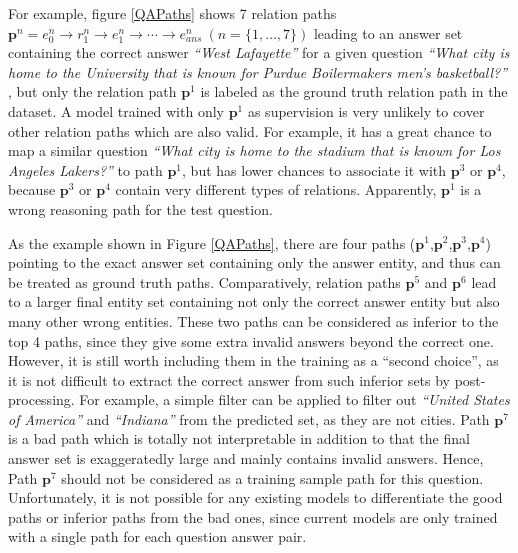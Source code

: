 For example, figure \ref{QAPaths} shows 7 relation paths $\mathbf{p}^n={e^n_0\rightarrow r^n_1 \rightarrow e^n_1 \rightarrow \cdots \rightarrow e^n_{ans}}\ (n=\lbrace 1, \dots, 7 \rbrace)$ leading to an answer set containing the correct answer \textit{``West Lafayette''} for a given question \textit{``What city is home to the University that is known for Purdue Boilermakers men's basketball?''}%
, but only the relation path $\mathbf{p}^1$ is labeled as the ground truth relation path in the dataset. A model trained with only $\mathbf{p}^1$ as supervision is very unlikely to cover other relation paths which are also valid. For example, it has a great chance to map a similar question \textit{``What city is home to the stadium that is known for Los Angeles Lakers?''} to path $\mathbf{p}^1$, but has lower chances to associate it with $\mathbf{p}^3$ or $\mathbf{p}^4$, because $\mathbf{p}^3$ or $\mathbf{p}^4$ contain very different types of relations. Apparently, $\mathbf{p}^1$ is a wrong reasoning path for the test question.

As the example shown in Figure \ref{QAPaths}, there are four paths ($\mathbf{p}^1$,$\mathbf{p}^2$,$\mathbf{p}^3$,$\mathbf{p}^4$) pointing to the exact answer set containing only the answer entity, and thus can be treated as ground truth paths. Comparatively, relation paths $\mathbf{p}^5$ and $\mathbf{p}^6$ lead to a larger final entity set containing not only the correct answer entity but also many other wrong entities. These two paths can be considered as inferior to the top 4 paths, since they give some extra invalid answers beyond the correct one. However, it is still worth including them in the training as a ``second choice'', as it is not difficult to extract the correct answer from such inferior sets by post-processing. For example, a simple filter can be applied to filter out \textit{``United States of America''} and \textit{``Indiana''} from the predicted set, as they are not cities. Path $\mathbf{p}^7$ is a bad path which is totally not interpretable in addition to that the final answer set is exaggeratedly large and mainly contains invalid answers. Hence, Path $\mathbf{p}^7$ should not be considered as a training sample path for this question. Unfortunately, it is not possible for any existing models to differentiate the good paths or inferior paths from the bad ones, since current models are only trained with a single path for each question answer pair.

